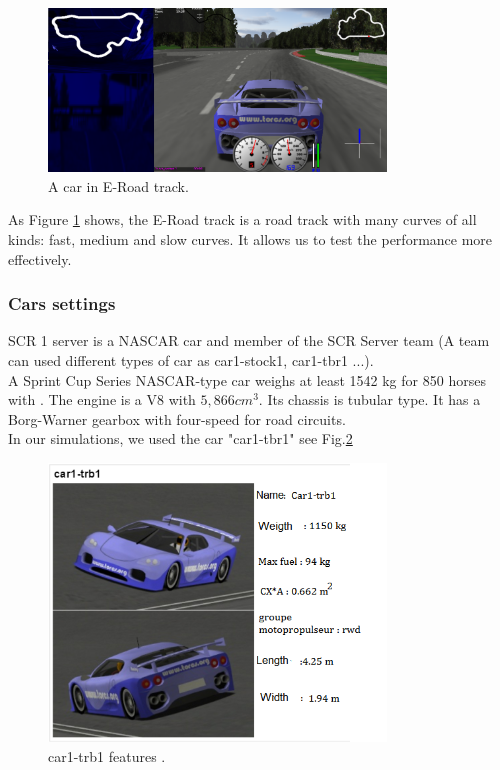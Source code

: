\documentclass{llncs}
\begin{document}
\begin{figure}[h!]
	
	\centering
	\includegraphics[width=0.8\textwidth]{fig/Eroad.PNG}
	\begin{minipage}{10cm}
		\centering
		\caption{\footnotesize A car in E-Road track.}
		\label{fig30}
	\end{minipage} 
	
\end{figure}
As Figure \ref{fig30} shows, the E-Road track is a road track with many curves of all kinds: fast, medium and slow curves. It allows us to test the performance more effectively.


\subsubsection{ Cars settings}

SCR 1 server is a NASCAR car and member of the SCR Server team (A team can used different types of car as  car1-stock1, car1-tbr1 ...).\\
A Sprint Cup Series NASCAR-type car weighs at least 1542 kg for 850 horses with . The engine is a V8 with  $ 5,866 cm ^ 3 $. Its chassis is tubular type. It has a Borg-Warner gearbox with four-speed for road circuits.\\

In our simulations, we used the car "car1-tbr1" see Fig.\ref{car} 
\begin{figure}[h!]
	
	\centering
	\includegraphics[width=0.8\textwidth]{fig/car1.PNG}
	\begin{minipage}{10cm}
		\centering
		\caption{\footnotesize car1-trb1 features  .}
		\label{car}
	\end{minipage} 
	
\end{figure}
\end{document}
